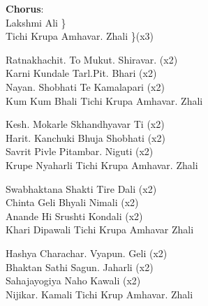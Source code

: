 
{\bf Chorus}: \\
Lakshmi Ali \} \\
Tichi Krupa Amhavar. Zhali \}(x3) \linebreak[2]

Ratnakhachit. To Mukut. Shiravar. (x2) \\
Karni Kundale Tarl.Pit. Bhari (x2) \\
Nayan. Shobhati Te Kamalapari (x2) \\
Kum Kum Bhali Tichi Krupa Amhavar. Zhali \linebreak[2]


Kesh. Mokarle Skhandhyavar Ti (x2) \\
Harit. Kanchuki Bhuja Shobhati (x2) \\
Savrit Pivle Pitambar. Niguti (x2) \\
Krupe Nyaharli Tichi Krupa Amhavar. Zhali \linebreak[2]

Swabhaktana Shakti Tire Dali (x2) \\
Chinta Geli Bhyali Nimali (x2) \\
Anande Hi Srushti Kondali (x2) \\
Khari Dipawali Tichi Krupa Amhavar Zhali \linebreak[2]



Hashya Charachar. Vyapun. Geli (x2) \\
Bhaktan Sathi Sagun. Jaharli (x2) \\
Sahajayogiya Naho Kawali (x2) \\
Nijikar. Kamali Tichi Krup Amhavar. Zhali

\newpage